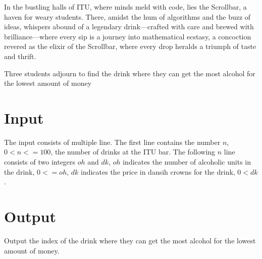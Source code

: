 



In the bustling halls of ITU, where minds meld with code, 
lies the Scrollbar, a haven for weary students. 
There, amidst the hum of algorithms and the buzz of ideas, 
whispers abound of a legendary drink—crafted with care and 
brewed with brilliance—where every sip is a journey into 
mathematical ecstasy, a concoction revered as the elixir 
of the Scrollbar, where every drop heralds a triumph of taste and thrift.

Three students adjourn to find the drink where they can get the most alcohol
for the lowest amount of money

\section*{Input}

The input consists of multiple line. The first line contains the number $n$, $0 < n <= 100$, the number of drinks at the ITU bar.
The following $n$ line consists of two integers $oh$ and $dk$, $oh$ indicates the number of alcoholic units in the drink, $0 <= oh$, $dk$ indicates the price in dansih crowns for the drink, $0 < dk$.

\section*{Output}

Output the index of the drink where they can get the most alcohol for the lowest amount of money.
